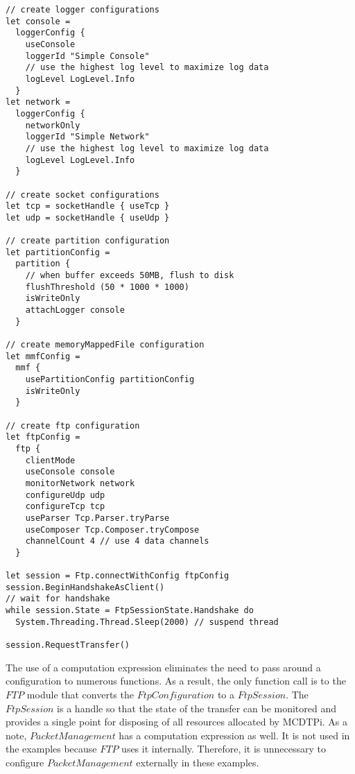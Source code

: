 \begin{lstlisting}[caption=Client Example]
// create logger configurations
let console =
  loggerConfig {
    useConsole
    loggerId "Simple Console"
    // use the highest log level to maximize log data
    logLevel LogLevel.Info
  }
let network =
  loggerConfig {
    networkOnly
    loggerId "Simple Network"
    // use the highest log level to maximize log data
    logLevel LogLevel.Info
  }

// create socket configurations
let tcp = socketHandle { useTcp }
let udp = socketHandle { useUdp }

// create partition configuration
let partitionConfig =
  partition {
    // when buffer exceeds 50MB, flush to disk
    flushThreshold (50 * 1000 * 1000)
    isWriteOnly
    attachLogger console
  }

// create memoryMappedFile configuration
let mmfConfig =
  mmf {
    usePartitionConfig partitionConfig
    isWriteOnly
  }

// create ftp configuration
let ftpConfig =
  ftp {
    clientMode
    useConsole console
    monitorNetwork network
    configureUdp udp
    configureTcp tcp
    useParser Tcp.Parser.tryParse
    useComposer Tcp.Composer.tryCompose
    channelCount 4 // use 4 data channels
  }

let session = Ftp.connectWithConfig ftpConfig
session.BeginHandshakeAsClient()
// wait for handshake
while session.State = FtpSessionState.Handshake do
  System.Threading.Thread.Sleep(2000) // suspend thread

session.RequestTransfer()

\end{lstlisting}

The use of a computation expression eliminates the need to pass around a configuration to numerous functions. As a result, the only function call is to the $FTP$ module that converts the $FtpConfiguration$ to a $FtpSession$. The $FtpSession$ is a handle so that the state of the transfer can be monitored and provides a single point for disposing of all resources allocated by MCDTPi. As a note, $PacketManagement$ has a computation expression as well. It is not used in the examples because $FTP$ uses it internally. Therefore, it is unnecessary to configure $PacketManagement$ externally in these examples.